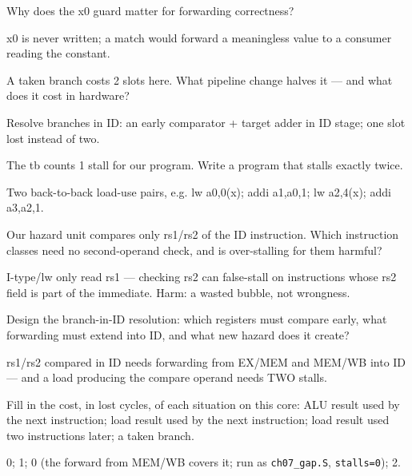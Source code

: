 \begin{exercise}[medium]\label{ex:m07b}
Why does the x0 guard matter for forwarding correctness?
\end{exercise}
\begin{solution}[hint]
x0 is never written; a match would forward a meaningless value to
a consumer reading the constant.
\end{solution}

\begin{exercise}[medium]\label{ex:m07c}
A taken branch costs 2 slots here. What pipeline change halves it
--- and what does it cost in hardware?
\end{exercise}
\begin{solution}[hint]
Resolve branches in ID: an early comparator + target adder in ID
stage; one slot lost instead of two.
\end{solution}

\begin{exercise}[medium]\label{ex:m07d}
The tb counts 1 stall for our program. Write a program that stalls
exactly twice.
\end{exercise}
\begin{solution}[hint]
Two back-to-back load-use pairs, e.g. lw a0,0(x); addi a1,a0,1;
lw a2,4(x); addi a3,a2,1.
\end{solution}

\begin{exercise}[hard]\label{ex:h07a}
Our hazard unit compares only rs1/rs2 of the ID instruction. Which
instruction classes need no second-operand check, and is
over-stalling for them harmful?
\end{exercise}
\begin{solution}[hint]
I-type/lw only read rs1 --- checking rs2 can false-stall on
instructions whose rs2 field is part of the immediate. Harm:
a wasted bubble, not wrongness.
\end{solution}

\begin{exercise}[hard]\label{ex:h07b}
Design the branch-in-ID resolution: which registers must compare
early, what forwarding must extend into ID, and what new hazard
does it create?
\end{exercise}
\begin{solution}[hint]
rs1/rs2 compared in ID needs forwarding from EX/MEM and MEM/WB into
ID --- and a load producing the compare operand needs TWO stalls.
\end{solution}


\begin{exercise}[easy]\label{ex:e07c}
Fill in the cost, in lost cycles, of each situation on this core:
ALU result used by the next instruction; load result used by the next
instruction; load result used two instructions later; a taken branch.
\end{exercise}
\begin{solution}[hint]
0; 1; 0 (the forward from MEM/WB covers it; run as
\texttt{ch07\_gap.S}, \texttt{stalls=0}); 2.
\end{solution}

